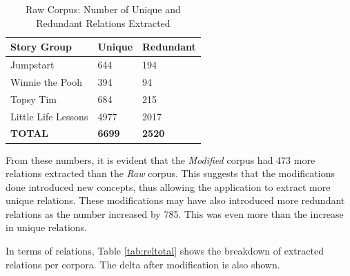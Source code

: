 \begin{table}[H]   %
\centering
\caption{Raw Corpus: Number of Unique and Redundant Relations Extracted} \vspace{0.25em}
\begin{tabular}{|p{4cm}|p{3cm}|p{3cm}|} \hline
\textbf{Story Group} & \textbf{Unique} & \textbf{Redundant} \\ \hline
Jumpstart & 644 & 194 \\ \hline
Winnie the Pooh & 394 & 94 \\ \hline
Topsy Tim & 684 & 215 \\ \hline
Little Life Lessons & 4977 & 2017 \\ \hline
\textbf{TOTAL} & \textbf{6699} & \textbf{2520} \\ \hline
\end{tabular}
\label{tab:rawtotal}
\end{table}

From these numbers, it is evident that the \textit{Modified} corpus had 473 more relations extracted than the \textit{Raw} corpus. This suggests that the modifications done introduced new concepts, thus allowing the application to extract more unique relations. These modifications may have also introduced more redundant relations as the number increased by 785. This was even more than the increase in unique relations. 

In terms of relations, Table \ref{tab:reltotal} shows the breakdown of extracted relations per corpora. The delta after modification is also shown. 

